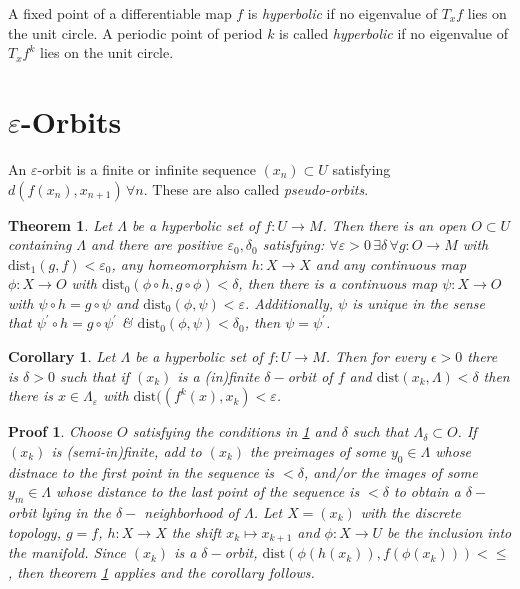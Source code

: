 \documentclass{article}
\newtheorem{thm}{Theorem}
\newtheorem{cor}{Corollary}
\newtheorem*{pf}{Proof}
\begin{document}
\indent A fixed point of a differentiable map $f$ is \textit{hyperbolic} if no eigenvalue of $T_xf$ lies on the unit circle. A periodic point of period $k$ is called \textit{hyperbolic} if no eigenvalue of $T_x f^k$ lies on the unit circle.

\section{$\varepsilon$-Orbits}

\indent An $\varepsilon$-orbit is a finite or infinite sequence $(x_n) \subset U$ satisfying $d(f(x_n),x_{n+1}) \hspace{2pt} \forall n$. These are also called \textit{pseudo-orbits}.

\begin{thm}\label{thm:???}
Let $\Lambda$ be a hyperbolic set of $f:U \to M$. Then there is an open $O \subset U$ containing $\Lambda$ and there are positive $\varepsilon_0,\delta_0$ satisfying: $\forall \varepsilon > 0 \hspace{2pt} \exists \delta \hspace{2pt}\forall g: O \to M$ with $\mathrm{dist}_1(g,f)< \varepsilon_0$, any homeomorphism $h: X \to X$ and any continuous map $\phi: X \to O$ with $\mathrm{dist}_0(\phi \circ h, g \circ \phi) < \delta $, then there is a continuous map $\psi: X \to O$ with $\psi \circ h = g \circ \psi$ and $\mathrm{dist}_0(\phi,\psi)< \varepsilon$. Additionally, $\psi$ is unique in the sense that $\psi^{\prime} \circ h = g \circ \psi^{\prime}$ \& $\mathrm{dist}_0(\phi,\psi) < \delta_0$, then $\psi=\psi^{\prime}$.
\end{thm}

\begin{cor}

Let $\Lambda$ be a hyperbolic set of $f:U \to M$. Then for every $\epsilon>0$ there is $\delta>0$ such that if $(x_k)$ is a (in)finite $\delta-$orbit of $f$ and $\mathrm{dist}(x_k,\Lambda) < \delta$ then there is $x \in \Lambda_{\varepsilon}$ with $\mathrm{dist}((f^k(x),x_k) < \varepsilon$.

\end{cor}

\begin{pf}

Choose $O$ satisfying the conditions in \ref{thm:???} and $\delta$ such that $\Lambda_{\delta} \subset O$. If $(x_k)$ is (semi-in)finite, add to $(x_k)$ the preimages of some $y_0 \in \Lambda$ whose distnace to the first point in the sequence is $< \delta$, and/or the images of some $y_m \in \Lambda$ whose distance to the last point of the sequence is $< \delta$ to obtain a $\delta-$orbit lying in the $\delta-$ neighborhood of $\Lambda$. Let $X = (x_k)$ with the discrete topology, $g=f$, $h:X \to X$ the shift $x_k \mapsto x_{k+1}$ and $\phi: X \to U$ be the inclusion into the manifold. Since $(x_k)$ is a $\delta-$orbit, $\mathrm{dist}(\phi(h(x_k)),f(\phi(x_k))) < \leq$, then theorem \ref{thm:???} applies and the corollary follows.

\end{pf}
\end{document}
